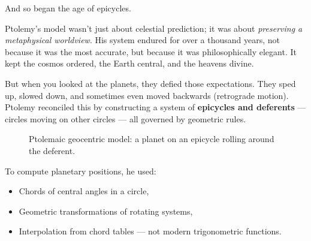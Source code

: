 And so began the age of epicycles.

Ptolemy’s model wasn’t just about celestial prediction; it was about \emph{preserving a metaphysical worldview}. His system endured for over a thousand years, not because it was the most accurate, but because it was philosophically elegant. It kept the cosmos ordered, the Earth central, and the heavens divine.

But when you looked at the planets, they defied those expectations. They sped up, slowed down, and sometimes even moved backwards (retrograde motion). Ptolemy reconciled this by constructing a system of \textbf{epicycles and deferents} — circles moving on other circles — all governed by geometric rules.

\begin{figure}[H]
    \centering
    \caption{Ptolemaic geocentric model: a planet on an epicycle rolling around the deferent.}
\end{figure}

To compute planetary positions, he used:

\begin{itemize}
    \item Chords of central angles in a circle,
    \item Geometric transformations of rotating systems,
    \item Interpolation from chord tables — not modern trigonometric functions.
\end{itemize}


